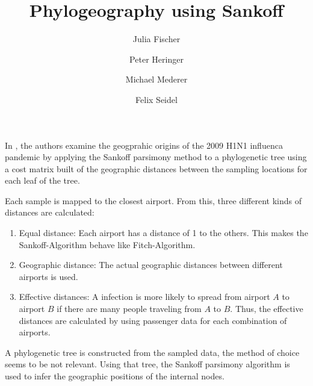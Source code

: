 \documentclass{article}
\title{Phylogeography using Sankoff}
\author{Julia Fischer 
\and 
Peter Heringer
\and
Michael Mederer
\and
Felix Seidel}
\begin{document}
\maketitle

In \cite{reimering2020phylogeographic}, the authors examine the geogprahic
origins of the 2009 H1N1 influenca pandemic by applying the Sankoff parsimony
method to a phylogenetic tree using a cost matrix built of the geographic
distances between the sampling locations for each leaf of the tree.

Each sample is mapped to the closest airport. From this, three different kinds
of distances are calculated:
\begin{enumerate}
    \item Equal distance: Each airport has a distance of 1 to the others. This
    makes the Sankoff-Algorithm behave like Fitch-Algorithm.
    \item Geographic distance: The actual geographic distances between different
    airports is used.
    \item Effective distances: A infection is more likely to spread from
    airport $A$ to airport $B$ if there are many people traveling from $A$ to
    $B$. Thus, the effective distances are calculated by using passenger data
    for each combination of airports.
\end{enumerate}

A phylogenetic tree is constructed from the sampled data, the method of choice
seems to be not relevant. Using that tree, the Sankoff parsimony algorithm is
used to infer the geographic positions of the internal nodes.

\printbibliography
\end{document}
